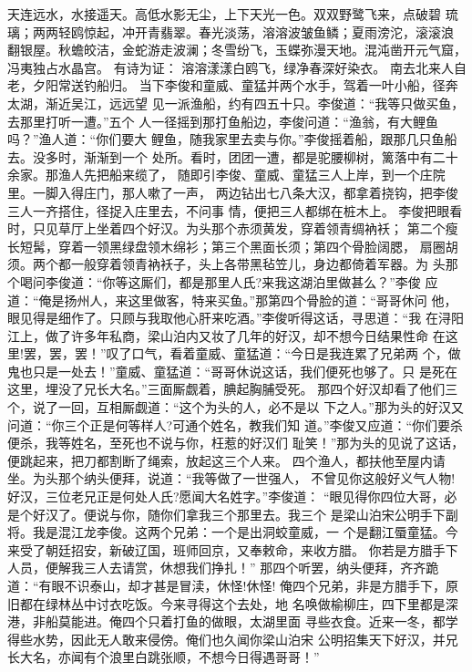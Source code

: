 天连远水，水接遥天。高低水影无尘，上下天光一色。双双野鹭飞来，点破碧
琉璃；两两轻鸥惊起，冲开青翡翠。春光淡荡，溶溶波皱鱼鳞；夏雨滂沱，滚滚浪
翻银屋。秋蟾皎洁，金蛇游走波澜；冬雪纷飞，玉蝶弥漫天地。混沌凿开元气窟，
冯夷独占水晶宫。
有诗为证：
溶溶漾漾白鸥飞，绿净春深好染衣。
南去北来人自老，夕阳常送钓船归。
当下李俊和童威、童猛并两个水手，驾着一叶小船，径奔太湖，渐近吴江，远远望
见一派渔船，约有四五十只。李俊道：“我等只做买鱼，去那里打听一遭。”五个
人一径摇到那打鱼船边，李俊问道：“渔翁，有大鲤鱼吗？”渔人道：“你们要大
鲤鱼，随我家里去卖与你。”李俊摇着船，跟那几只鱼船去。没多时，渐渐到一个
处所。看时，团团一遭，都是驼腰柳树，篱落中有二十余家。那渔人先把船来缆了，
随即引李俊、童威、童猛三人上岸，到一个庄院里。一脚入得庄门，那人嗽了一声，
两边钻出七八条大汉，都拿着挠钩，把李俊三人一齐搭住，径捉入庄里去，不问事
情，便把三人都绑在桩木上。
李俊把眼看时，只见草厅上坐着四个好汉。为头那个赤须黄发，穿着领青绸衲袄；
第二个瘦长短髯，穿着一领黑绿盘领木绵衫；第三个黑面长须；第四个骨脸阔腮，
扇圈胡须。两个都一般穿着领青衲袄子，头上各带黑毡笠儿，身边都倚着军器。为
头那个喝问李俊道：“你等这厮们，都是那里人氏?来我这湖泊里做甚么？”李俊
应道：“俺是扬州人，来这里做客，特来买鱼。”那第四个骨脸的道：“哥哥休问
他，眼见得是细作了。只顾与我取他心肝来吃酒。”李俊听得这话，寻思道：“我
在浔阳江上，做了许多年私商，梁山泊内又妆了几年的好汉，却不想今日结果性命
在这里!罢，罢，罢！”叹了口气，看着童威、童猛道：“今日是我连累了兄弟两
个，做鬼也只是一处去！”童威、童猛道：“哥哥休说这话，我们便死也够了。只
是死在这里，埋没了兄长大名。”三面厮觑着，腆起胸脯受死。
那四个好汉却看了他们三个，说了一回，互相厮觑道：“这个为头的人，必不是以
下之人。”那为头的好汉又问道：“你三个正是何等样人?可通个姓名，教我们知
道。”李俊又应道：“你们要杀便杀，我等姓名，至死也不说与你，枉惹的好汉们
耻笑！”那为头的见说了这话，便跳起来，把刀都割断了绳索，放起这三个人来。
四个渔人，都扶他至屋内请坐。为头那个纳头便拜，说道：“我等做了一世强人，
不曾见你这般好义气人物!好汉，三位老兄正是何处人氏?愿闻大名姓字。”李俊道：
“眼见得你四位大哥，必是个好汉了。便说与你，随你们拿我三个那里去。我三个
是梁山泊宋公明手下副将。我是混江龙李俊。这两个兄弟：一个是出洞蛟童威，一
个是翻江蜃童猛。今来受了朝廷招安，新破辽国，班师回京，又奉敕命，来收方腊。
你若是方腊手下人员，便解我三人去请赏，休想我们挣扎！”
那四个听罢，纳头便拜，齐齐跪道：“有眼不识泰山，却才甚是冒渎，休怪!休怪!
俺四个兄弟，非是方腊手下，原旧都在绿林丛中讨衣吃饭。今来寻得这个去处，地
名唤做榆柳庄，四下里都是深港，非船莫能进。俺四个只着打鱼的做眼，太湖里面
寻些衣食。近来一冬，都学得些水势，因此无人敢来侵傍。俺们也久闻你梁山泊宋
公明招集天下好汉，并兄长大名，亦闻有个浪里白跳张顺，不想今日得遇哥哥！”
